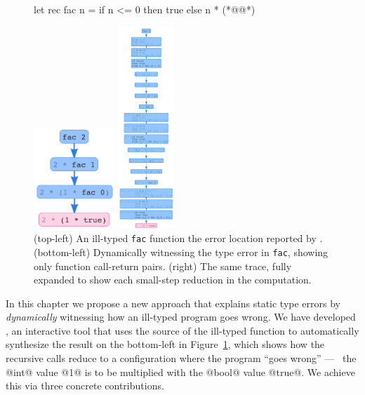 \begin{figure}[t]
\centering
\begin{minipage}{.49\linewidth}
\centering
\begin{ecode}
  let rec fac n =
    if n <= 0 then
      true
    else
      n * (*@@*)
\end{ecode}
\vspace{2em}
\includegraphics[height=1.5in]{nanomaly/fac-overview.png}
\end{minipage}
\begin{minipage}{.49\linewidth}
\centering
\includegraphics[height=3in]{nanomaly/fac-long.png}
\end{minipage}
\vspace{1em}
\caption{(top-left) An ill-typed \texttt{fac} function  the error location reported by \ocaml. (bottom-left) Dynamically witnessing the type error in \texttt{fac}, showing only function call-return pairs. (right) The same trace, fully expanded to show each small-step reduction in the computation.}
\label{fig:factorial}
\end{figure}

In this chapter we propose a new approach that explains
static type errors by \emph{dynamically} witnessing
how an ill-typed program goes wrong.
%
We have developed \toolname, an interactive tool that uses
the source of the ill-typed function to automatically synthesize
the result on the bottom-left in Figure~\ref{fig:factorial}, which
shows how the recursive calls reduce to a configuration where
the program ``goes wrong'' --- \ie\ the @int@ value @1@ is to be
multiplied with the @bool@ value @true@.
We achieve this via three concrete contributions.

